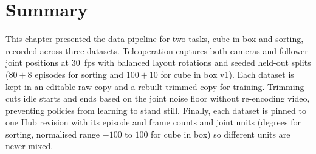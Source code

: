 \section{Summary}
This chapter presented the data pipeline for two tasks, cube in box and sorting, recorded across three datasets. Teleoperation captures both cameras and follower joint positions at 30~fps with balanced layout rotations and seeded held-out splits ($80+8$ episodes for sorting and $100+10$ for cube in box v1). Each dataset is kept in an editable raw copy and a rebuilt trimmed copy for training. Trimming cuts idle starts and ends based on the joint noise floor without re-encoding video, preventing policies from learning to stand still. Finally, each dataset is pinned to one Hub revision with its episode and frame counts and joint units (degrees for sorting, normalised range $-100$ to $100$ for cube in box) so different units are never mixed.
